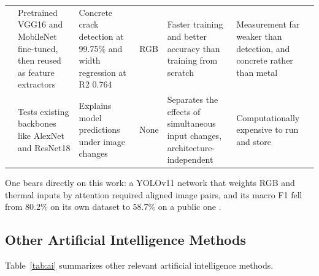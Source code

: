 {\begin{xltabular}{\textwidth}{p{0.95cm}>{\RaggedRight\arraybackslash}p{2.6cm}>{\RaggedRight\arraybackslash}p{2.6cm}>{\RaggedRight\arraybackslash}p{2.1cm}>{\RaggedRight\arraybackslash}X>{\RaggedRight\arraybackslash}X}
\citep{Su2024} & Pretrained VGG16 and MobileNet fine-tuned, then reused as feature extractors & Concrete crack detection at 99.75\% and width regression at R2 0.764 & RGB & Faster training and better accuracy than training from scratch & Measurement far weaker than detection, and concrete rather than metal \\
\citep{Kharyuk2026} & Tests existing backbones like AlexNet and ResNet18 & Explains model predictions under image changes & None & Separates the effects of simultaneous input changes, architecture-independent & Computationally expensive to run and store \\
\end{xltabular}
}


One bears directly on this work: a YOLOv11 network that weights RGB and thermal
inputs by attention required aligned image pairs, and its macro F1 fell from
80.2\% on its own dataset to 58.7\% on a public one \citep{Zhang2026b}.

\subsection{Other Artificial Intelligence Methods}

Table~\ref{tab:ai} summarizes other relevant artificial intelligence methods.


